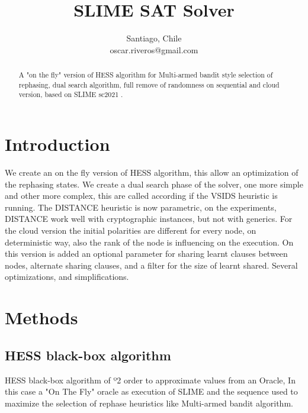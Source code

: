 \documentclass[conference]{IEEEtran}
\begin{document}
\title{SLIME SAT Solver\\
}

\author{
Santiago, Chile \\
oscar.riveros@gmail.com
}

\maketitle

\begin{abstract}
A "on the fly" version of HESS algorithm for Multi-armed bandit style selection of rephasing, dual search algorithm, full remove of randomness on sequential and cloud version, based on SLIME sc2021 \cite{b1}.
\end{abstract}

\section{Introduction}
We create an on the fly version of HESS \cite{b1} algorithm, this allow an optimization of the rephasing states.
We create a dual search phase of the solver, one more simple and other more complex, this are called according if the VSIDS heuristic is running.
The DISTANCE heuristic is now parametric, on the experiments, DISTANCE work well with cryptographic instances, but not with generics.
For the cloud version the initial polarities are different for every node, on deterministic way, also the rank of the node is influencing on the execution.
On this version is added an optional parameter for sharing learnt clauses between nodes, alternate sharing clauses, and a filter for the size of learnt shared.
Several optimizations, and simplifications.
\section{Methods}

\subsection{HESS black-box algorithm}

HESS black-box algorithm \cite{b1} of º2 order to approximate values from an Oracle, In this case a "On The Fly" oracle as execution of SLIME and the sequence used to maximize the selection of rephase heuristics like Multi-armed bandit algorithm.
\end{document}
